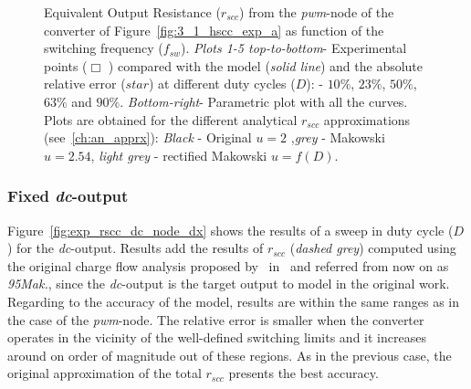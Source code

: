 \begin{figure}[!h]
\centering
    \begin{subfigure}{0.45\textwidth}
        
    \end{subfigure}
    \hfill
    \begin{subfigure}{0.45\textwidth}
        
    \end{subfigure}

    \begin{subfigure}{0.45\textwidth}
        
    \end{subfigure}
    \hfill
    \begin{subfigure}{0.45\textwidth}
        
    \end{subfigure}

        \begin{subfigure}{0.45\textwidth}
        
    \end{subfigure}
    \hfill
    \begin{subfigure}{0.45\textwidth}
        
    \end{subfigure}

\caption{Equivalent Output Resistance ($r_{scc}$) from the \emph{pwm}-node of the converter of Figure~\ref{fig:3_1_hscc_exp_a} as function of the switching frequency ($f_{sw}$). \emph{Plots 1-5 top-to-bottom}-  Experimental points ($\Box$ ) compared with the model (\emph{solid line}) and the absolute relative error ($star$)  at different duty cycles ($D$): - $10\%$, $23\%$, $50\%$, $63\%$ and $90\%$. \emph{Bottom-right}- Parametric plot with all the curves. Plots are obtained for the different analytical $r_{scc}$ approximations (see~\ref{ch:an_apprx}): \emph{Black} - Original $u=2$ ,\emph{grey} - Makowski  $u=2.54$, \emph{light grey} - rectified Makowski $u=f(D)$. }\label{fig:exp_rscc_pwm_node_fsw}
\end{figure}

\clearpage
\subsubsection{ Fixed \emph{dc}-output}
Figure~\ref{fig:exp_rscc_dc_node_dx} shows the results of a sweep in duty cycle ($D$) for the \emph{dc}-output. Results add the results of $r_{scc}$ (\emph{dashed grey}) computed using the original charge flow analysis proposed by~\citeauthor{95Makowski} in~\citeyear{95Makowski} and referred from now on as \emph{95Mak.}, since the \emph{dc}-output is the target output to model in the original work. Regarding to the accuracy of the model, results are within the same ranges as in the case of the \emph{pwm}-node. The relative error is smaller when the converter operates in the vicinity of the well-defined switching limits and it increases around on order of magnitude out of these regions. As in the previous case, the original approximation of the total $r_{scc}$ presents the best accuracy.

